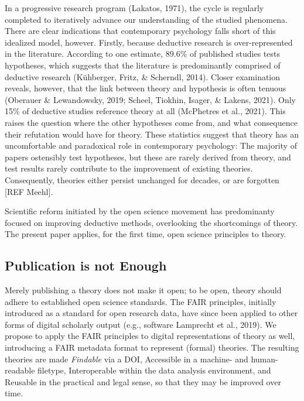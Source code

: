 \documentclass[
  man]{apa6}
\begin{document}
In a progressive research program (Lakatos, 1971),
the cycle is regularly completed to iteratively advance our understanding of the studied phenomena.
There are clear indications that contemporary psychology falls short of this idealized model, however.
Firstly, because deductive research is over-represented in the literature.
According to one estimate, 89.6\% of published studies tests hypotheses,
which suggests that the literature is predominantly comprised of deductive research (Kühberger, Fritz, \& Scherndl, 2014).
Closer examination reveals, however, that the link between theory and hypothesis is often tenuous (Oberauer \& Lewandowsky, 2019; Scheel, Tiokhin, Isager, \& Lakens, 2021).
Only 15\% of deductive studies reference theory at all (McPhetres et al., 2021).
This raises the question where the other hypotheses come from,
and what consequence their refutation would have for theory.
These statistics suggest that theory has an uncomfortable and paradoxical role in contemporary psychology:
The majority of papers ostensibly test hypotheses,
but these are rarely derived from theory,
and test results rarely contribute to the improvement of existing theories.
Consequently, theories either persist unchanged for decades, or are forgotten {[}REF Meehl{]}.

Scientific reform initiated by the open science movement has predominanty focused on improving deductive methods, overlooking the shortcomings of theory.
The present paper applies, for the first time, open science principles to theory.

\subsection{Publication is not Enough}\label{publication-is-not-enough}

Merely publishing a theory does not make it open;
to be open, theory should adhere to established open science standards.
The FAIR principles, initially introduced as a standard for open research data, have since been applied to other forms of digital scholarly output (e.g., software Lamprecht et al., 2019).
We propose to apply the FAIR principles to digital representations of theory as well,
introducing a FAIR metadata format to represent (formal) theories.
The resulting theories are made \emph{Findable} via a DOI,
Accessible in a machine- and human-readable filetype,
Interoperable within the data analysis environment,
and Reusable in the practical and legal sense, so that they may be improved over time.
\end{document}
